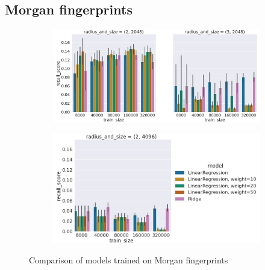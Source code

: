 
\hfill\break
\subsection{Morgan fingerprints}


\begin{figure}[H]
\centering
\begin{subfigure}{\textwidth}
\includegraphics[scale = 0.4]{Images/DifferentMorgan1.jpg}
\end{subfigure}
\hfill\break
\begin{subfigure}{\textwidth}
\includegraphics[scale = 0.55]{Images/DifferentMorgan2.jpg}
\end{subfigure}
\caption{Comparison of models trained on Morgan fingerprints}
\end{figure}

